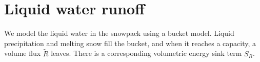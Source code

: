 \documentclass[twoside,10pt]{report}
\begin{document}





\section{Liquid water runoff}\label{sec:snow_runoff}
We model the liquid water in the snowpack using a bucket model. Liquid precipitation and melting snow fill the bucket, and when it reaches a capacity, a volume flux $\tilde{R}$ leaves. There is a corresponding volumetric energy sink term $S_R$. 
\end{document}
